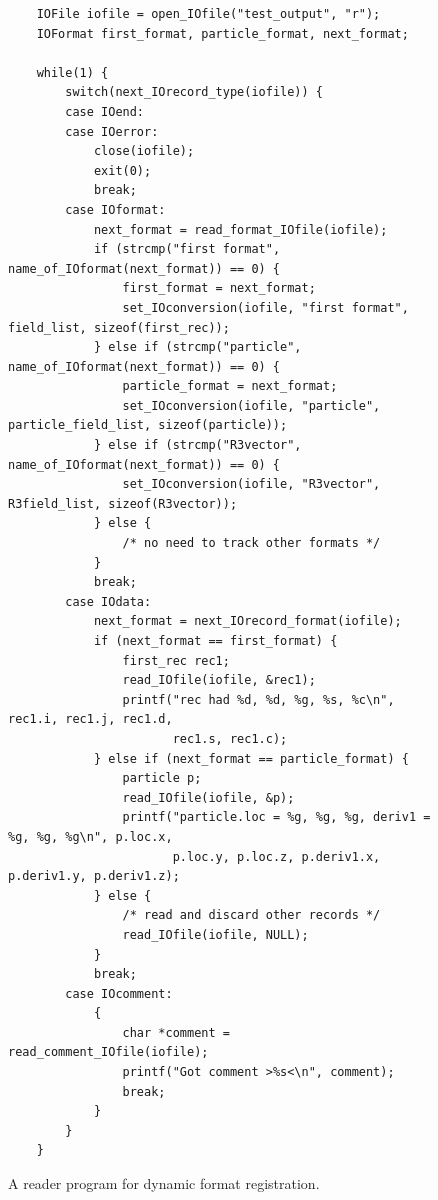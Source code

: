 \begin{figure}
\begin{verbatim}
    IOFile iofile = open_IOfile("test_output", "r");
    IOFormat first_format, particle_format, next_format;

    while(1) {
        switch(next_IOrecord_type(iofile)) {
        case IOend:
        case IOerror:
            close(iofile);
            exit(0);
            break;
        case IOformat:
            next_format = read_format_IOfile(iofile);
            if (strcmp("first format", name_of_IOformat(next_format)) == 0) {
                first_format = next_format;
                set_IOconversion(iofile, "first format", field_list, sizeof(first_rec));
            } else if (strcmp("particle", name_of_IOformat(next_format)) == 0) {
                particle_format = next_format;
                set_IOconversion(iofile, "particle", particle_field_list, sizeof(particle));
            } else if (strcmp("R3vector", name_of_IOformat(next_format)) == 0) {
                set_IOconversion(iofile, "R3vector", R3field_list, sizeof(R3vector));
            } else {
                /* no need to track other formats */
            }
            break;
        case IOdata:
            next_format = next_IOrecord_format(iofile);
            if (next_format == first_format) {
                first_rec rec1;
                read_IOfile(iofile, &rec1);
                printf("rec had %d, %d, %g, %s, %c\n", rec1.i, rec1.j, rec1.d, 
                       rec1.s, rec1.c);
            } else if (next_format == particle_format) {
                particle p;
                read_IOfile(iofile, &p);
                printf("particle.loc = %g, %g, %g, deriv1 = %g, %g, %g\n", p.loc.x,
                       p.loc.y, p.loc.z, p.deriv1.x, p.deriv1.y, p.deriv1.z); 
            } else {
                /* read and discard other records */
                read_IOfile(iofile, NULL);
            }
            break;
        case IOcomment:
            {
                char *comment = read_comment_IOfile(iofile);
                printf("Got comment >%s<\n", comment);
                break;
            }
        }
    }
\end{verbatim}
\caption{A reader program for dynamic format registration.\label{fig:dynread}}
\end{figure}


